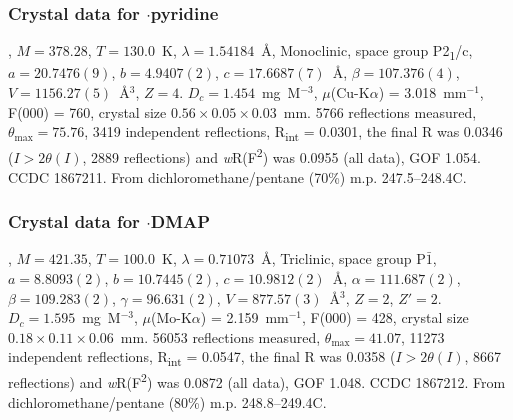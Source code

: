 \begin{refsection}
\subsubsection{Crystal data for $\cdot$pyridine}
, $M=378.28$, $T=130.0$~K, $\lambda=1.54184$~\AA, Monoclinic, space group P2\textsubscript{1}/c, $a = 20.7476(9)$, $b = 4.9407(2)$, $c = 17.6687(7)$~\AA, $\beta = 107.376(4)$\degree, $V = 1156.27(5)$~\AA$^{3}$, $Z = 4$.
$D_{c} = 1.454$~mg~M$^{-3}$, $\mu$(Cu-K$\alpha$) = 3.018~mm$^{-1}$, F(000) = 760, crystal size $0.56 \times 0.05 \times 0.03$~mm.
5766 reflections measured, $\theta_{\mathrm{max}} = 75.76$\degree, 3419 independent reflections, R\textsubscript{int} = 0.0301, the final R was 0.0346 ($I > 2\theta(I)$, 2889 reflections) and \emph{w}R(F\textsuperscript{2}) was 0.0955 (all data), GOF 1.054. 
CCDC 1867211. 
From dichloromethane/pentane (70\%) m.p. 247.5--248.4\degree C.

\subsubsection{Crystal data for $\cdot$DMAP}
, $M = 421.35$, $T=100.0$~K, $\lambda=0.71073$~\AA, Triclinic, space group P$\bar{1}$, $a = 8.8093(2)$, $b = 10.7445(2)$, $c = 10.9812(2)$~\AA, $\alpha = 111.687(2)$\degree, $\beta = 109.283(2)$\degree, $\gamma = 96.631(2)$\degree, $V = 877.57(3)$~\AA$^{3}$, $Z = 2$, $Z\prime = 2$.
$D_{c}= 1.595$~mg~M$^{-3}$, $\mu$(Mo-K$\alpha$) = 2.159~mm$^{-1}$, F(000) = 428, crystal size $0.18 \times 0.11 \times 0.06$~mm.
56053 reflections measured, $\theta_{\mathrm{max}} = 41.07$\degree, 11273 independent reflections, R\textsubscript{int} = 0.0547, the final R was 0.0358 ($I > 2\theta(I)$, 8667 reflections) and \emph{w}R(F\textsuperscript{2}) was 0.0872 (all data), GOF 1.048. 
CCDC 1867212. 
From dichloromethane/pentane (80\%) m.p. 248.8--249.4\degree C.

\printbibliography[heading=subbibliography]
\end{refsection}


